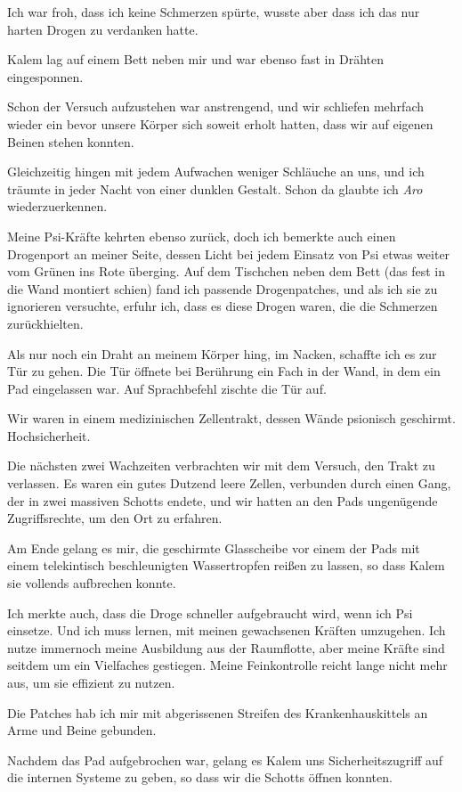\documentclass[11pt]{article}
\begin{document}
Ich war froh, dass ich keine Schmerzen spürte, wusste aber dass ich das
nur harten Drogen zu verdanken hatte.

Kalem lag auf einem Bett neben mir und war ebenso fast in Drähten
eingesponnen.

Schon der Versuch aufzustehen war anstrengend, und wir schliefen
mehrfach wieder ein bevor unsere Körper sich soweit erholt hatten, dass
wir auf eigenen Beinen stehen konnten.

Gleichzeitig hingen mit jedem Aufwachen weniger Schläuche an uns, und
ich träumte in jeder Nacht von einer dunklen Gestalt. Schon da glaubte
ich \emph{Aro} wiederzuerkennen.

Meine Psi-Kräfte kehrten ebenso zurück, doch ich bemerkte auch einen
Drogenport an meiner Seite, dessen Licht bei jedem Einsatz von Psi etwas
weiter vom Grünen ins Rote überging. Auf dem Tischchen neben dem Bett
(das fest in die Wand montiert schien) fand ich passende Drogenpatches,
und als ich sie zu ignorieren versuchte, erfuhr ich, dass es diese
Drogen waren, die die Schmerzen zurückhielten.

Als nur noch ein Draht an meinem Körper hing, im Nacken, schaffte ich es
zur Tür zu gehen. Die Tür öffnete bei Berührung ein Fach in der Wand, in
dem ein Pad eingelassen war. Auf Sprachbefehl zischte die Tür auf.

Wir waren in einem medizinischen Zellentrakt, dessen Wände psionisch
geschirmt. Hochsicherheit.

Die nächsten zwei Wachzeiten verbrachten wir mit dem Versuch, den Trakt
zu verlassen. Es waren ein gutes Dutzend leere Zellen, verbunden durch
einen Gang, der in zwei massiven Schotts endete, und wir hatten an den
Pads ungenügende Zugriffsrechte, um den Ort zu erfahren.

Am Ende gelang es mir, die geschirmte Glasscheibe vor einem der Pads mit
einem telekintisch beschleunigten Wassertropfen reißen zu lassen, so
dass Kalem sie vollends aufbrechen konnte.

Ich merkte auch, dass die Droge schneller aufgebraucht wird, wenn ich
Psi einsetze. Und ich muss lernen, mit meinen gewachsenen Kräften
umzugehen. Ich nutze immernoch meine Ausbildung aus der Raumflotte, aber
meine Kräfte sind seitdem um ein Vielfaches gestiegen. Meine
Feinkontrolle reicht lange nicht mehr aus, um sie effizient zu nutzen.

Die Patches hab ich mir mit abgerissenen Streifen des Krankenhauskittels
an Arme und Beine gebunden.

Nachdem das Pad aufgebrochen war, gelang es Kalem uns Sicherheitszugriff
auf die internen Systeme zu geben, so dass wir die Schotts öffnen
konnten.
\end{document}
